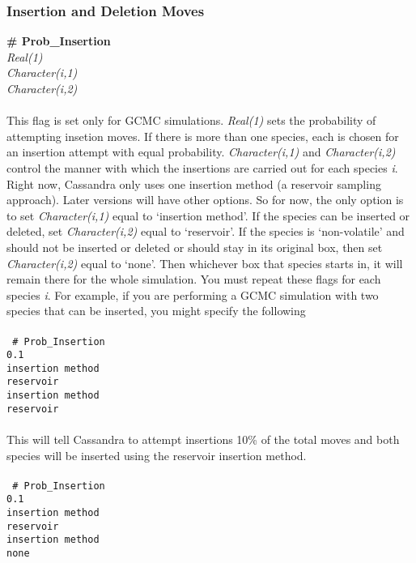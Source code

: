 \subsubsection{Insertion and Deletion Moves}
{\bf \# Prob\_Insertion} \\
{\it Real(1)} \\
{\it Character(i,1)} \\
{\it Character(i,2)} \\ \\
%
This flag is set only for GCMC simulations. {\it Real(1)} sets the
probability of attempting insetion moves. If there is more than one
species, each is chosen for an insertion attempt with equal
probability. {\it Character(i,1)} and {\it Character(i,2)} control the
manner with which the insertions are carried out for each species {\em
  i}. Right now, Cassandra
only uses one insertion method (a reservoir sampling approach). Later versions
will have other options. So for now, the only option is to set {\it
  Character(i,1)} equal to `insertion method'. If the species can be
inserted or deleted, set {\it Character(i,2)} equal to `reservoir'. If
the species is `non-volatile' and should not be inserted or deleted
or should stay in its original box, then set {\it Character(i,2)} equal
  to `none'. Then whichever box that species starts in, it will remain
  there for the whole simulation. You must repeat these flags for each species
{\em i}.  For example, if you are performing a GCMC
simulation with two species that can be inserted, you might specify
the following \\ \\ 
%                                                                                                                                           
\texttt{
\# Prob\_Insertion \\
0.1 \\
insertion method \\
reservoir \\
insertion method \\
reservoir} \\ \\ 
%
This will tell Cassandra to attempt insertions 10\% of the total moves and
both species will be inserted using
the reservoir insertion method.  \\ \\
%                                                                                                                                           
\texttt{
\# Prob\_Insertion \\
0.1 \\
insertion method \\
reservoir \\
insertion method \\
none} \\ \\ 
